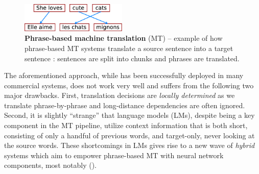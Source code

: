 \begin{figure}[tbh!]
\centering
\includegraphics[width=0.45\textwidth, clip=true, trim= 0 0 0
0]{img/phrasemt.eps} %
\caption[Phrase-based machine translation]{{\bf Phrase-based machine translation} (MT) -- example of how phrase-based
MT systems translate a source sentence  into a target sentence
: sentences are split into chunks and phrases
are translated.
} 
\label{f:phrase_mt}
\end{figure}

The aforementioned approach, while has been successfully deployed in many commercial systems,
does not work very well and suffers from the following two major drawbacks.
First, translation decisions are {\it locally determined} as we translate
phrase-by-phrase and long-distance dependencies are often ignored. Second, it is
slightly ``strange'' that language models (LMs), despite being a key component in the MT
pipeline, utilize context information that is both short, consisting of only
a handful of previous words, and target-only, never looking at the source
words. These shortcomings in LMs gives rise to a new wave of {\it hybrid} systems which
aim to empower phrase-based MT with neural network components, most notably
\nlmtext{} (\nlms{}). 

